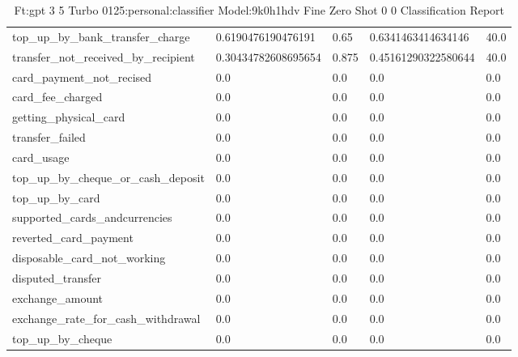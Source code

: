 \begin{table}[!ht]
\begin{tabularx}{\textwidth}{X l l l l}
top\_up\_by\_bank\_transfer\_charge & \num{0.6190476190476191} & \num{0.65} & \num{0.6341463414634146} & \num{40.0} \\
transfer\_not\_received\_by\_recipient & \num{0.30434782608695654} & \num{0.875} & \num{0.45161290322580644} & \num{40.0} \\
card\_payment\_not\_recised & \num{0.0} & \num{0.0} & \num{0.0} & \num{0.0} \\
card\_fee\_charged & \num{0.0} & \num{0.0} & \num{0.0} & \num{0.0} \\
getting\_physical\_card & \num{0.0} & \num{0.0} & \num{0.0} & \num{0.0} \\
transfer\_failed & \num{0.0} & \num{0.0} & \num{0.0} & \num{0.0} \\
card\_usage & \num{0.0} & \num{0.0} & \num{0.0} & \num{0.0} \\
top\_up\_by\_cheque\_or\_cash\_deposit & \num{0.0} & \num{0.0} & \num{0.0} & \num{0.0} \\
top\_up\_by\_card & \num{0.0} & \num{0.0} & \num{0.0} & \num{0.0} \\
supported\_cards\_andcurrencies & \num{0.0} & \num{0.0} & \num{0.0} & \num{0.0} \\
reverted\_card\_payment & \num{0.0} & \num{0.0} & \num{0.0} & \num{0.0} \\
disposable\_card\_not\_working & \num{0.0} & \num{0.0} & \num{0.0} & \num{0.0} \\
disputed\_transfer & \num{0.0} & \num{0.0} & \num{0.0} & \num{0.0} \\
exchange\_amount & \num{0.0} & \num{0.0} & \num{0.0} & \num{0.0} \\
exchange\_rate\_for\_cash\_withdrawal & \num{0.0} & \num{0.0} & \num{0.0} & \num{0.0} \\
top\_up\_by\_cheque & \num{0.0} & \num{0.0} & \num{0.0} & \num{0.0} \\
\bottomrule
\end{tabularx}

        \caption{Ft:gpt 3 5 Turbo 0125:personal:classifier Model:9k0h1hdv Fine Zero Shot 0 0 Classification Report}
        \label{tab:ft:gpt-3-5-turbo-0125:personal:classifier-model:9k0H1hdV-fine-zero-shot-0-0-classification-report}
    \end{table}
    